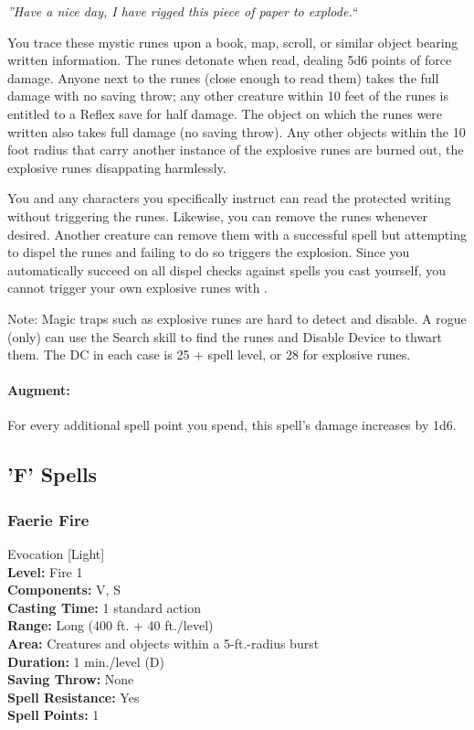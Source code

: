 \emph{''Have a nice day, I have rigged this piece of paper to explode.``}

You trace these mystic runes upon a book, map, scroll, or similar object bearing written information. 
The runes detonate when read, dealing 5d6 points of force damage. 
Anyone next to the runes (close enough to read them) takes the full damage with no saving throw; 
any other creature within 10 feet of the runes is entitled to a Reflex save for half damage. 
The object on which the runes were written also takes full damage (no saving throw).
Any other objects within the 10 foot radius that carry another instance of the explosive runes
are burned out, the explosive runes disappating harmlessly.

You and any characters you specifically instruct can read the protected writing without triggering the runes. 
Likewise, you can remove the runes whenever desired. 
Another creature can remove them with a successful  spell %
but attempting to dispel the runes and failing to do so triggers the explosion.
Since you automatically succeed on all dispel checks against spells you cast yourself, 
you cannot trigger your own explosive runes with .

Note: Magic traps such as explosive runes are hard to detect and disable. 
A rogue (only) can use the Search skill to find the runes and Disable Device to thwart them. 
The DC in each case is 25 + spell level, or 28 for explosive runes.

\paragraph{Augment:} For every additional spell point you spend, this spell's damage increases by 1d6.
\subsection{'F' Spells}
\subsubsection{Faerie Fire}
\label{Spell:FaerieFire}
Evocation [Light]
\\ \textbf{Level:} Fire 1
\\ \textbf{Components:} V, S
\\ \textbf{Casting Time:} 1 standard action
\\ \textbf{Range:} Long (400 ft. + 40 ft./level)
\\ \textbf{Area:} Creatures and objects within a 5-ft.-radius burst
\\ \textbf{Duration:} 1 min./level (D)
\\ \textbf{Saving Throw:} None
\\ \textbf{Spell Resistance:} Yes
\\ \textbf{Spell Points:} 1

